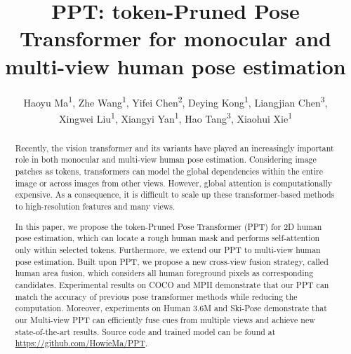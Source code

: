\documentclass[runningheads]{llncs}
\begin{document}
\pagestyle{headings}
\mainmatter
\def\ECCVSubNumber{46}  

\title{PPT: token-Pruned Pose Transformer for monocular and multi-view human pose estimation} 









\author{Haoyu Ma\textsuperscript{1}, Zhe Wang\textsuperscript{1}, Yifei Chen\textsuperscript{2}, Deying Kong\textsuperscript{1}, Liangjian Chen\textsuperscript{3}, \\ 
Xingwei Liu\textsuperscript{1}, Xiangyi Yan\textsuperscript{1}, Hao Tang\textsuperscript{3}, Xiaohui Xie\textsuperscript{1}}




\maketitle



\begin{abstract}
Recently, the vision transformer and its variants have played an increasingly important role in both monocular and multi-view human pose estimation. Considering image patches as tokens, transformers can model the global dependencies within the entire image or across images from other views. However, global attention is computationally expensive. As a consequence, it is difficult to scale up these transformer-based methods to high-resolution features and many views. 

In this paper, we propose the token-Pruned Pose Transformer (PPT) for 2D human pose estimation, which can locate a rough human mask and performs self-attention only within selected tokens. 
Furthermore, we extend our PPT to multi-view human pose estimation. Built upon PPT, we propose a new cross-view fusion strategy, called human area fusion, which considers all human foreground pixels as corresponding candidates. Experimental results on COCO and MPII demonstrate that our PPT can match the accuracy of previous pose transformer methods while reducing the computation.  Moreover, experiments on Human 3.6M and Ski-Pose demonstrate that our Multi-view PPT can efficiently fuse cues from multiple views and achieve new state-of-the-art results. 
Source code and trained model can be found at 
\url{https://github.com/HowieMa/PPT}.



\end{abstract}
\end{document}
